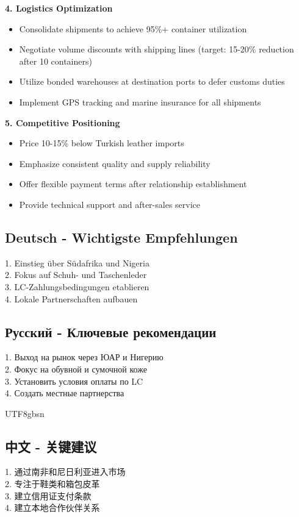\documentclass[12pt,a4paper]{article}
\begin{document}
\textbf{4. Logistics Optimization}
\begin{itemize}
    \item Consolidate shipments to achieve 95\%+ container utilization
    \item Negotiate volume discounts with shipping lines (target: 15-20\% reduction after 10 containers)
    \item Utilize bonded warehouses at destination ports to defer customs duties
    \item Implement GPS tracking and marine insurance for all shipments
\end{itemize}

\textbf{5. Competitive Positioning}
\begin{itemize}
    \item Price 10-15\% below Turkish leather imports
    \item Emphasize consistent quality and supply reliability
    \item Offer flexible payment terms after relationship establishment
    \item Provide technical support and after-sales service
\end{itemize}

\subsection*{Deutsch - Wichtigste Empfehlungen}
1. Einstieg über Südafrika und Nigeria\\
2. Fokus auf Schuh- und Taschenleder\\
3. LC-Zahlungsbedingungen etablieren\\
4. Lokale Partnerschaften aufbauen

\subsection*{Русский - Ключевые рекомендации}
1. Выход на рынок через ЮАР и Нигерию\\
2. Фокус на обувной и сумочной коже\\
3. Установить условия оплаты по LC\\
4. Создать местные партнерства

\begin{CJK}{UTF8}{gbsn}
\subsection*{中文 - 关键建议}
1. 通过南非和尼日利亚进入市场\\
2. 专注于鞋类和箱包皮革\\
3. 建立信用证支付条款\\
4. 建立本地合作伙伴关系
\end{CJK}
\end{document}
